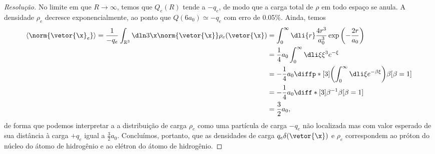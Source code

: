 \begin{proof}[Resolução]
    No limite em que \(R \to \infty\), temos que \(Q_e(R)\) tende a \(-q_e\), de modo que a carga total de \(\rho\) em todo espaço se anula. A densidade \(\rho_e\) decresce exponencialmente, ao ponto que \(Q(6 a_0) \simeq -q_e\) com erro de 0.05\%. Ainda, temos
    \begin{align*}
        \langle \norm{\vetor{\x}_e} \rangle = \frac{1}{-q_e} \int_{\mathbb{R}^3} \dln3\x \norm{\vetor{\x}} \rho_e(\vetor{\x})
        &= \int_0^\infty \dli{r} \frac{4r^3}{a_0^3}\exp\left(-\frac{2r}{a_0}\right)\\
        &= \frac14a_0 \int_0^\infty \dli\xi \xi^3 e^{-\xi}\\
        &= -\frac14a_0 \diffp*[3]{\left(\int_0^\infty \dli\xi e^{-\beta \xi}\right)}{\beta}[\beta = 1]\\
        &= -\frac14a_0 \diff*[3]{\beta^{-1}}{\beta}[\beta = 1]\\
        &= \frac32a_0,
    \end{align*}
    de forma que podemos interpretar a a distribuição de carga \(\rho_e\) como uma partícula de carga \(-q_e\) não localizada mas com valor esperado de sua distância à carga \(+q_e\) igual a \(\frac32 a_0\). Concluímos, portanto, que as densidades de carga \(q_e \delta(\vetor{\x})\) e \(\rho_e\) correspondem ao próton do núcleo do átomo de hidrogênio e ao elétron do átomo de hidrogênio.
\end{proof}
